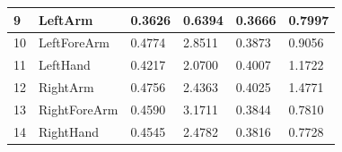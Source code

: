 \begin{table}[h]
\begin{tabular}{ll|l|l|l|l|}
\multicolumn{1}{|l|}{9}                                                       & LeftArm                                               & 0.3626                                                           & 0.6394                                                        & 0.3666                                                          & 0.7997                                                        \\ \hline
\multicolumn{1}{|l|}{10}                                                      & LeftForeArm                                           & 0.4774                                                           & 2.8511                                                        & 0.3873                                                          & 0.9056                                                        \\ \hline
\multicolumn{1}{|l|}{11}                                                      & LeftHand                                              & 0.4217                                                           & 2.0700                                                        & 0.4007                                                          & 1.1722                                                        \\ \hline
\multicolumn{1}{|l|}{12}                                                      & RightArm                                              & 0.4756                                                           & 2.4363                                                        & 0.4025                                                          & 1.4771                                                        \\ \hline
\multicolumn{1}{|l|}{13}                                                      & RightForeArm                                          & 0.4590                                                           & 3.1711                                                        & 0.3844                                                          & 0.7810                                                        \\ \hline
\multicolumn{1}{|l|}{14}                                                      & RightHand                                             & 0.4545                                                           & 2.4782                                                        & 0.3816                                                          & 0.7728                                                        \\ \hline

\end{tabular}
\end{table}
